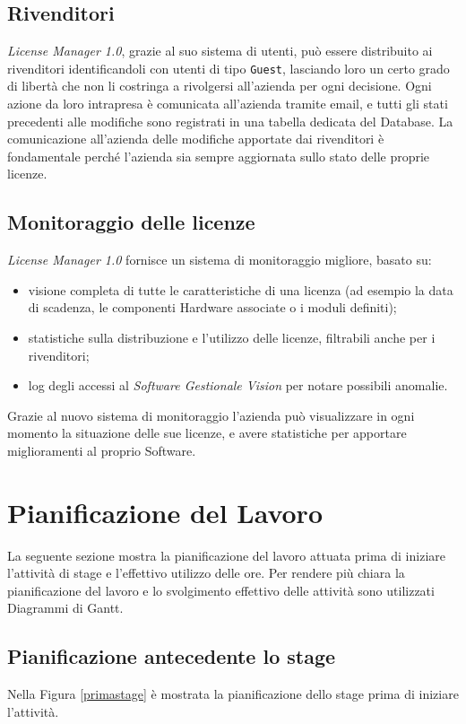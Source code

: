 \subsection{Rivenditori}

\textit{License Manager 1.0}, grazie al suo sistema di utenti, può essere distribuito ai rivenditori identificandoli con utenti di tipo \texttt{Guest}, lasciando loro un certo grado di libertà che non li costringa a rivolgersi all’azienda per ogni decisione. Ogni azione da loro intrapresa è comunicata all’azienda tramite email, e tutti gli stati precedenti alle modifiche sono registrati in una tabella dedicata del Database. La comunicazione all'azienda delle modifiche apportate dai rivenditori è fondamentale perché l'azienda sia sempre aggiornata sullo stato delle proprie licenze.

\subsection{Monitoraggio delle licenze}

\textit{License Manager 1.0} fornisce un sistema di monitoraggio migliore, basato su:
\begin{itemize}
\item visione completa di tutte le caratteristiche di una licenza (ad esempio la data di scadenza, le componenti Hardware associate o i moduli definiti);
\item statistiche sulla distribuzione e l'utilizzo delle licenze, filtrabili anche per i rivenditori;
\item log degli accessi al \textit{Software Gestionale Vision} per notare possibili anomalie.
\end{itemize}
Grazie al nuovo sistema di monitoraggio l'azienda può visualizzare in ogni momento la situazione delle sue licenze, e avere statistiche per apportare miglioramenti al proprio Software.


\section{Pianificazione del Lavoro}

La seguente sezione mostra la pianificazione del lavoro attuata prima di iniziare l'attività di stage e l'effettivo utilizzo delle ore. Per rendere più chiara la pianificazione del lavoro e lo svolgimento effettivo delle attività sono utilizzati Diagrammi di Gantt.

\subsection{Pianificazione antecedente lo stage}
Nella Figura \ref{primastage} è mostrata la pianificazione dello stage prima di iniziare l'attività.


